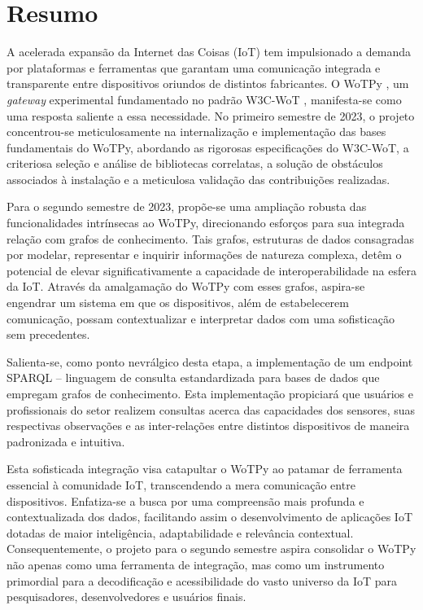 \chapter{Resumo}


A acelerada expansão da Internet das Coisas (IoT) tem impulsionado a demanda por plataformas e ferramentas que garantam uma comunicação integrada e transparente entre dispositivos oriundos de distintos fabricantes. O WoTPy , um \textit{gateway} experimental fundamentado no padrão W3C-WoT , manifesta-se como uma resposta saliente a essa necessidade. No primeiro semestre de 2023, o projeto concentrou-se meticulosamente na internalização e implementação das bases fundamentais do WoTPy, abordando as rigorosas especificações do W3C-WoT, a criteriosa seleção e análise de bibliotecas correlatas, a solução de obstáculos associados à instalação e a meticulosa validação das contribuições realizadas.

Para o segundo semestre de 2023, propõe-se uma ampliação robusta das funcionalidades intrínsecas ao WoTPy, direcionando esforços para sua integrada relação com grafos de conhecimento. Tais grafos, estruturas de dados consagradas por modelar, representar e inquirir informações de natureza complexa, detêm o potencial de elevar significativamente a capacidade de interoperabilidade na esfera da IoT. Através da amalgamação do WoTPy com esses grafos, aspira-se engendrar um sistema em que os dispositivos, além de estabelecerem comunicação, possam contextualizar e interpretar dados com uma sofisticação sem precedentes.

Salienta-se, como ponto nevrálgico desta etapa, a implementação de um endpoint SPARQL  – linguagem de consulta estandardizada para bases de dados que empregam grafos de conhecimento. Esta implementação propiciará que usuários e profissionais do setor realizem consultas acerca das capacidades dos sensores, suas respectivas observações e as inter-relações entre distintos dispositivos de maneira padronizada e intuitiva.

Esta sofisticada integração visa catapultar o WoTPy ao patamar de ferramenta essencial à comunidade IoT, transcendendo a mera comunicação entre dispositivos. Enfatiza-se a busca por uma compreensão mais profunda e contextualizada dos dados, facilitando assim o desenvolvimento de aplicações IoT dotadas de maior inteligência, adaptabilidade e relevância contextual. Consequentemente, o projeto para o segundo semestre aspira consolidar o WoTPy não apenas como uma ferramenta de integração, mas como um instrumento primordial para a decodificação e acessibilidade do vasto universo da IoT para pesquisadores, desenvolvedores e usuários finais.


